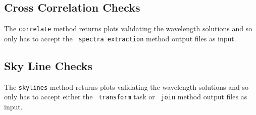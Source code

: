 




\subsection{Cross Correlation Checks} \label{subsec:test_corr}

The \texttt{correlate} method returns plots validating the wavelength solutions and so only has to accept the \polsalt\ \texttt{spectra extraction} method output files as input.


\subsection{Sky Line Checks} \label{subsec:test_sky}

The \texttt{skylines} method returns plots validating the wavelength solutions and so only has to accept either the \iraf\ \texttt{transform} task or \stops\ \texttt{join} method output files as input.


